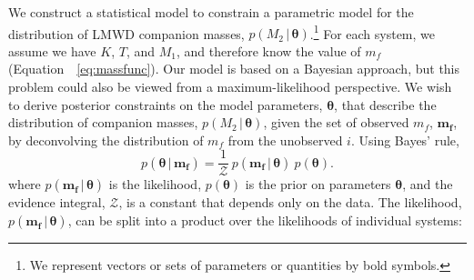 \documentclass[apjl]{emulateapj}
\newcommand{\given}{\,|\,}
\newcommand{\bs}[1]{\boldsymbol{#1}}
\newcommand{\eqn}{Equation~}
\newcommand{\mf}{m_f}
\begin{document}
We construct a statistical model to constrain a parametric model for the distribution of LMWD companion masses, $p(M_2 \given \bs{\theta})$.\footnote{We represent vectors or sets of parameters or quantities by bold symbols.} For each system, we assume we have $K$, $T$, and $M_1$, and therefore know the value of $\mf$ (\eqn~\ref{eq:massfunc}). Our model is based on a Bayesian approach, but this problem could also be viewed from a maximum-likelihood perspective. We wish to derive posterior constraints on the model parameters, $\bs{\theta}$, that describe the distribution of companion masses, $p(M_2\given \bs{\theta})$, given the set of observed $\mf$, $\bs{m_f}$, by deconvolving the distribution of $\mf$ from the unobserved $i$. Using Bayes' rule,
\begin{equation}
    p(\bs{\theta} \given \bs{\mf}) = \frac{1}{\mathcal{Z}}~p(\bs{\mf} \given \bs{\theta})~p(\bs{\theta}).
\end{equation}
where $p(\bs{\mf} \given \bs{\theta})$ is the likelihood, $p(\bs{\theta})$ is the prior on parameters $\bs{\theta}$, and the evidence integral, $\mathcal{Z}$, is a constant that depends only on the data. The likelihood, $p(\bs{\mf} \given \bs{\theta})$, can be split into a product over the likelihoods of individual systems:
\end{document}
